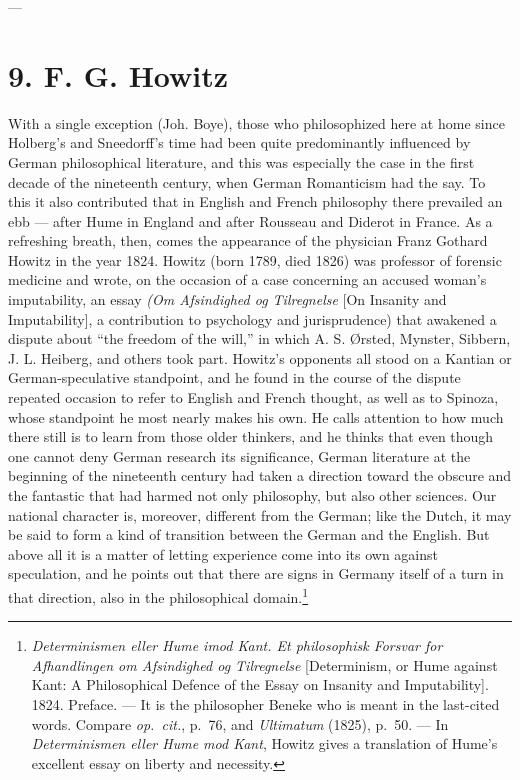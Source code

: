 \documentclass[12pt,a4paper]{book}
\newcommand{\dfchapter}[1]{%
  \chapter*{#1}%
  \addcontentsline{toc}{chapter}{#1}%
  \markboth{#1}{#1}%
}
\newcommand{\opage}[1]{\marginnote{\footnotesize\textit{[#1]}}}
\begin{document}
\begin{center}---\end{center}

\dfchapter{9. F. G. Howitz}
\label{ch:df-howitz}

\noindent \opage{81}With a single exception (Joh. Boye), those who philosophized here at home
since Holberg's and Sneedorff's time had been quite predominantly influenced by German
philosophical literature, and this was especially the case in the first decade of the
nineteenth century, when German Romanticism had the say. To this it also contributed
that in English and French philosophy there prevailed an ebb --- after Hume in England
and after Rousseau and Diderot in France. As a refreshing breath, then, comes the
appearance of the physician Franz Gothard Howitz in the year 1824. Howitz (born 1789,
died 1826) was professor of forensic medicine and wrote, on the occasion of a case
concerning an accused woman's imputability, an essay \emph{(Om Afsindighed og Tilregnelse}
[On Insanity and Imputability], a contribution to psychology and jurisprudence) that
awakened a dispute about ``the freedom of the will,'' in which A. S. Ørsted, Mynster,
Sibbern, J. L. Heiberg, and others took part. Howitz's opponents all stood on a Kantian
or German-speculative standpoint, and he found in the course of the dispute repeated
occasion to refer to English and French thought, as well as to Spinoza, whose standpoint
he most nearly makes his own. He calls attention to how much there still is to learn from
those older thinkers, and he thinks that even though one cannot deny German research its
significance, German literature at the beginning of the nineteenth century had taken a
direction toward the obscure and the fantastic that had harmed not only philosophy, but
also other sciences. Our national character is, moreover, different from the German; like
the Dutch, it may be said to form a kind of transition between the German and the
English. But above \opage{82}all it is a matter of letting experience come into its own against
speculation, and he points out that there are signs in Germany itself of a turn in that
direction, also in the philosophical domain.\footnote{\emph{Determinismen eller Hume imod
Kant. Et philosophisk Forsvar for Afhandlingen om Afsindighed og Tilregnelse}
[Determinism, or Hume against Kant: A Philosophical Defence of the Essay on Insanity and
Imputability]. 1824. Preface. --- It is the philosopher Beneke who is meant in the
last-cited words. Compare \emph{op.\ cit.}, p.~76, and \emph{Ultimatum} (1825), p.~50. ---
In \emph{Determinismen eller Hume mod Kant}, Howitz gives a translation of Hume's
excellent essay on liberty and necessity.}
\end{document}
